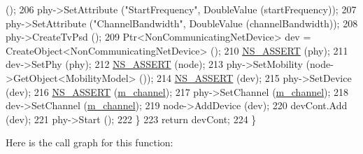 \begin{DoxyCode}
       ();
206       phy->SetAttribute (\textcolor{stringliteral}{"StartFrequency"}, DoubleValue (startFrequency));
207       phy->SetAttribute (\textcolor{stringliteral}{"ChannelBandwidth"}, DoubleValue (channelBandwidth));
208       phy->CreateTvPsd ();
209       Ptr<NonCommunicatingNetDevice> dev = CreateObject<NonCommunicatingNetDevice> ();
210       \hyperlink{assert_8h_a6dccdb0de9b252f60088ce281c49d052}{NS\_ASSERT} (phy);
211       dev->SetPhy (phy);
212       \hyperlink{assert_8h_a6dccdb0de9b252f60088ce281c49d052}{NS\_ASSERT} (node);
213       phy->SetMobility (node->GetObject<MobilityModel> ());
214       \hyperlink{assert_8h_a6dccdb0de9b252f60088ce281c49d052}{NS\_ASSERT} (dev);
215       phy->SetDevice (dev);
216       \hyperlink{assert_8h_a6dccdb0de9b252f60088ce281c49d052}{NS\_ASSERT} (\hyperlink{classns3_1_1TvSpectrumTransmitterHelper_afc92164bf4a2a99985189207ee3a53a8}{m\_channel});
217       phy->SetChannel (\hyperlink{classns3_1_1TvSpectrumTransmitterHelper_afc92164bf4a2a99985189207ee3a53a8}{m\_channel});
218       dev->SetChannel (\hyperlink{classns3_1_1TvSpectrumTransmitterHelper_afc92164bf4a2a99985189207ee3a53a8}{m\_channel});
219       node->AddDevice (dev);
220       devCont.Add (dev);
221       phy->Start ();
222     \}
223   \textcolor{keywordflow}{return} devCont;
224 \}
\end{DoxyCode}


Here is the call graph for this function\+:


